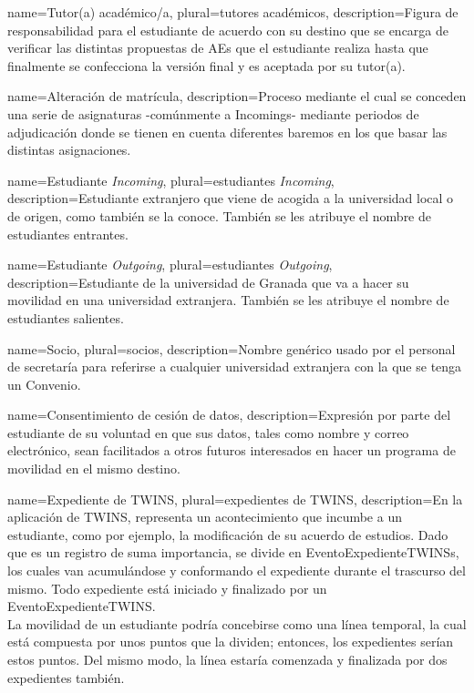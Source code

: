 {
	name=Tutor(a) académico/a,
	plural=tutores académicos,
	description={Figura de responsabilidad para el estudiante de acuerdo con su destino que se encarga de verificar las distintas propuestas de \glspl{AE} que el estudiante realiza hasta que finalmente se confecciona la versión final y es aceptada por su tutor(a).}
}

{
	name=Alteración de matrícula,
	description={Proceso mediante el cual se conceden una serie de asignaturas -comúnmente a \glspl{Incoming}- mediante periodos de adjudicación donde se tienen en cuenta diferentes baremos en los que basar las distintas asignaciones.}
}

{
	name=Estudiante \textit{Incoming},
	plural=estudiantes \textit{Incoming},
	description={Estudiante extranjero que viene de acogida a la universidad local o de origen, como también se la conoce. También se les atribuye el nombre de estudiantes entrantes.}
}

{
	name=Estudiante \textit{Outgoing},
	plural=estudiantes \textit{Outgoing},
	description={Estudiante de la universidad de Granada que va a hacer su movilidad en una universidad extranjera. También se les atribuye el nombre de estudiantes salientes.}
}

{
	name=Socio,
	plural=socios,
	description={Nombre genérico usado por el personal de secretaría para referirse a cualquier universidad extranjera con la que se tenga un \gls{Convenio}.}
}

{
	name=Consentimiento de cesión de datos,
	description={Expresión por parte del estudiante de su voluntad en que sus datos, tales como nombre y correo electrónico, sean facilitados a otros futuros interesados en hacer un programa de movilidad en el mismo destino.}
}

{
	name=Expediente de TWINS,
	plural=expedientes de TWINS,
	description={En la aplicación de TWINS, representa un acontecimiento que incumbe a un estudiante, como por ejemplo, la modificación de su acuerdo de estudios. Dado que es un registro de suma importancia, se divide en \glspl{EventoExpedienteTWINS}, los cuales van acumulándose y conformando el expediente durante el trascurso del mismo. Todo expediente está iniciado y finalizado por un \gls{EventoExpedienteTWINS}.\\La movilidad de un estudiante podría concebirse como una línea temporal, la cual está compuesta por unos puntos que la dividen; entonces, los expedientes serían estos puntos. Del mismo modo, la línea estaría comenzada y finalizada por dos expedientes también.}
}


